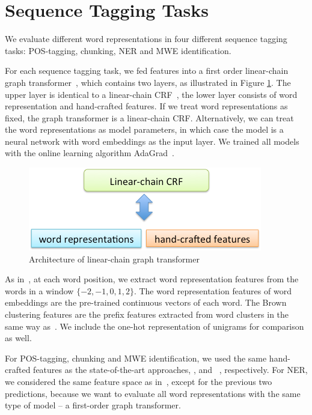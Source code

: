 \section{Sequence Tagging Tasks}
\label{sec:SeqTagging}
We evaluate different word representations in four different sequence tagging tasks: POS-tagging, chunking, NER and MWE identification. 

For each sequence tagging task, we fed features into a first order linear-chain graph
transformer~\cite{collobert2011natural}, which contains two layers, as illustrated in Figure \ref{fig:graph_transformer}. The upper layer is identical to a linear-chain CRF~\cite{lafferty2001conditional}, the lower layer consists of word representation and hand-crafted features. If we treat word representations as fixed, the graph transformer is a linear-chain CRF. Alternatively, we can treat the word representations as model parameters, in which case the model is a neural network with word embeddings as the input layer. We trained all models with the online learning algorithm AdaGrad~\cite{duchi2011adaptive}. 

\begin{figure}[hb]
  \centering
  \includegraphics[scale = 0.3]{images/graph_transformer.png}
  \caption{Architecture of linear-chain graph transformer}
  \label{fig:graph_transformer}
\end{figure}


As in~\cite{turian2010word}, at each word position, we extract word representation features from the words in a window $\{-2, -1, 0, 1, 2\}$. The word representation features of word embeddings are the pre-trained continuous vectors of each word.  The Brown clustering features are the prefix features extracted from word clusters in the same way as~\cite{turian2010word}. We include the one-hot representation of unigrams for comparison as well.

For POS-tagging, chunking and MWE identification, we used the same hand-crafted features as the state-of-the-art approaches,  ,  and ~, respectively. For NER, we considered the same feature space as in~\cite{turian2010word}, except for the previous two predictions, because we want to evaluate all word representations with the same type of model -- a first-order graph transformer.

